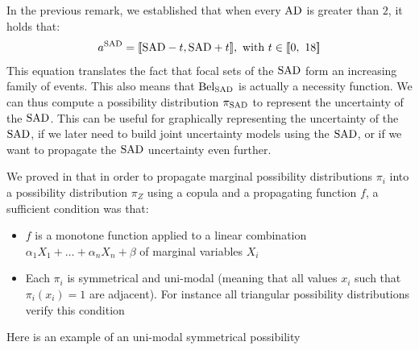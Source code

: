 \begin{remark}
    In the previous remark, we established that when every $\mathrm{AD}$ is greater than $2$, it holds that:
    \begin{align*}
        a^{\mathrm{SAD}} = [\![\mathrm{SAD}-t,\mathrm{SAD}+t]\!],\text{ with }t\in[\![0, ~18]\!]
    \end{align*}
    This equation translates the fact that focal sets of the $\mathrm{SAD}$ form an increasing family of events. This also means that $\mathrm{Bel}_{\mathrm{SAD}}$ is actually a necessity function. We can thus compute a possibility distribution $\pi_{\mathrm{SAD}}$ to represent the uncertainty of the $\mathrm{SAD}$. This can be useful for graphically representing the uncertainty of the $\mathrm{SAD}$, if we later need to build joint uncertainty models using the $\mathrm{SAD}$, or if we want to propagate the $\mathrm{SAD}$ uncertainty even further.
    
    We proved in \cite{malinowski_uncertainty_2024} that in order to propagate marginal possibility distributions $\pi_i$ into a possibility distribution $\pi_Z$ using a copula and a propagating function $f$, a sufficient condition was that:
    \begin{itemize}
        \item $f$ is a monotone function applied to a linear combination $\alpha_1X_1+\dots+\alpha_nX_n+\beta$ of marginal variables $X_i$
        \item Each $\pi_i$ is symmetrical and uni-modal (meaning that all values $x_i$ such that $\pi_i(x_i)=1$ are adjacent). For instance all triangular possibility distributions verify this condition
    \end{itemize}
    Here is an example of an uni-modal symmetrical possibility
\end{remark}
